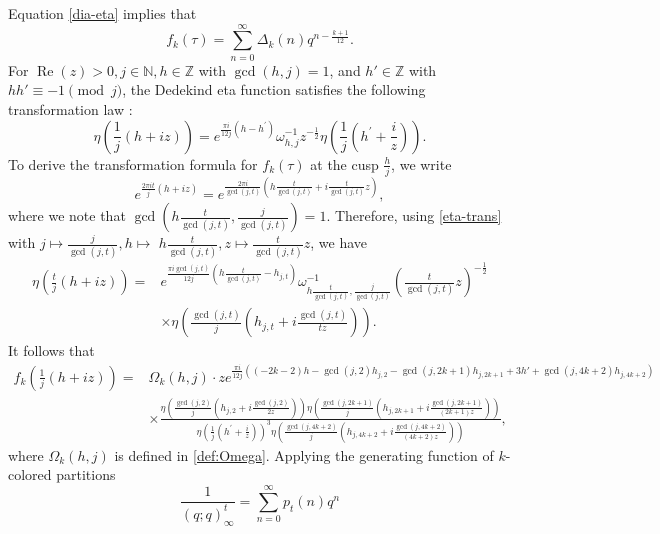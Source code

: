 \documentclass[12pt]{article}
\numberwithin{equation}{section}
\begin{document}
Equation \eqref{dia-eta} implies that
\begin{equation*}
f_{k}(\tau)=\sum_{n=0}^{\infty} \Delta_{k}(n) q^{n-\frac{k+1}{12}}.
\end{equation*}
For $\operatorname{Re}(z) > 0, j\in \mathbb{N}, h\in \mathbb{Z}$ with $\gcd(h, j) = 1$, and $h'\in\mathbb{Z}$ with
$hh' \equiv -1 \pmod j$, the Dedekind eta function satisfies the following transformation law \cite{Apostol-1990}:
\begin{equation}\label{eta-trans}
\eta\left(\frac{1}{j}(h+i z)\right)=e^{\frac{\pi i}{12 j}\left(h-h^{\prime}\right)} \omega_{h, j}^{-1} z^{-\frac{1}{2}} \eta\left(\frac{1}{j}\left(h^{\prime}+\frac{i}{z}\right)\right).
\end{equation}
To derive the transformation formula for $f_{k}(\tau)$ at the cusp $\frac{h}{j}$, we write
$$
e^{\frac{2 \pi i t}{j}(h+i z)}=e^{\frac{2 \pi i}{\operatorname{gcd}(j, t)}\left(h \frac{t}{\operatorname{gcd}(j, t)}+i \frac{t}{\operatorname{gcd}(j, t)} z\right)},
$$
where we note that $\gcd\left(h \frac{t}{\gcd(j, t)}, \frac{j}{\gcd(j, t)}\right)=1$. Therefore, using \eqref{eta-trans} with $j \mapsto \frac{j}{\gcd(j, t)}, h \mapsto$ $h \frac{t}{\gcd(j, t)}, z \mapsto \frac{t}{\gcd(j, t)} z$, we have
\begin{align*}
\eta\left(\frac{t}{j}(h+i z)\right)
=&e^{\frac{\pi i\gcd(j, t)}{12 j}\left(h\frac{t}{\gcd(j, t)} -h_{j,t}\right)}\omega_{h \frac{t}{\gcd(j, t)}, \frac{j}{\gcd(j, t)}}^{-1} \left(\frac{t}{\gcd(j, t)} z\right)^{-\frac{1}{2}}
\\
& \times\eta\left(\frac{\gcd(j, t)}{j}\left(h_{j, t}+i \frac{\gcd(j, t)}{t z}\right) \right).
\end{align*}
 It follows that
\begin{align*}
f_{k}\left(\frac{1}{j}(h+i z)\right)
=&\Omega_{k}(h,j)\cdot ze^{\frac{\pi i}{12j}\left((-2k-2)h-\gcd(j,2)h_{j, 2}-\gcd(j,2k+1)h_{j, 2k+1}+3h'+\gcd(j,4k+2)h_{j, 4k+2}\right)}
\\
&\times \frac{\eta\left(\frac{\gcd(j, 2)}{j}\left(h_{j, 2}+i \frac{\gcd(j, 2)}{2z}\right) \right)\eta\left(\frac{\gcd(j, 2k+1)}{j}\left(h_{j, 2k+1}+i \frac{\gcd(j, 2k+1)}{(2k+1) z}\right) \right)}{\eta\left(\frac{1}{j}\left(h^{\prime}+\frac{i}{z}\right)\right)^3
\eta\left(\frac{\gcd(j, 4k+2)}{j}\left(h_{j, 4k+2}+i \frac{\gcd(j, 4k+2)}{(4k+2) z}\right) \right)},
\end{align*}
where
$\Omega_{k}(h,j)$ is defined in \eqref{def:Omega}.
Applying the generating function of $k$-colored partitions
\begin{equation*}
\frac{1}{(q;q)_{\infty}^t}=\sum_{n=0}^{\infty}p_t(n)q^n
\end{equation*}
\end{document}
